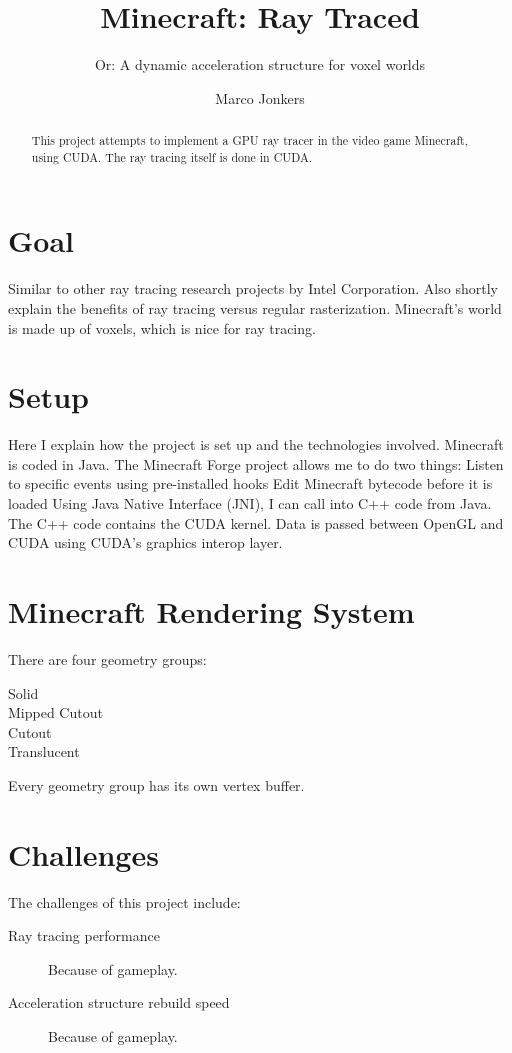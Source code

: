 \documentclass[]{scrartcl}
\title{Minecraft: Ray Traced}
\subtitle{Or: A dynamic acceleration structure for voxel worlds}
\author{Marco Jonkers}
\begin{document}
\maketitle

\begin{abstract}
This project attempts to implement a GPU ray tracer in the video game Minecraft, using CUDA.
The ray tracing itself is done in CUDA.
\end{abstract}

\section{Goal}
Similar to other ray tracing research projects by Intel Corporation.
Also shortly explain the benefits of ray tracing versus regular rasterization.
Minecraft's world is made up of voxels, which is nice for ray tracing.

\section{Setup}
Here I explain how the project is set up and the technologies involved.
Minecraft is coded in Java.
The Minecraft Forge project allows me to do two things:
    Listen to specific events using pre-installed hooks
    Edit Minecraft bytecode before it is loaded
Using Java Native Interface (JNI), I can call into C++ code from Java.
The C++ code contains the CUDA kernel.
Data is passed between OpenGL and CUDA using CUDA's graphics interop layer.

\section{Minecraft Rendering System}
There are four geometry groups:
\begin{description}
    \item[Solid]
    \item[Mipped Cutout]
    \item[Cutout]
    \item[Translucent]
\end{description}
Every geometry group has its own vertex buffer.

\section{Challenges}
The challenges of this project include:
\begin{description}
    \item [Ray tracing performance] Because of gameplay.
    \item [Acceleration structure rebuild speed] Because of gameplay.
\end{description}
\end{document}
